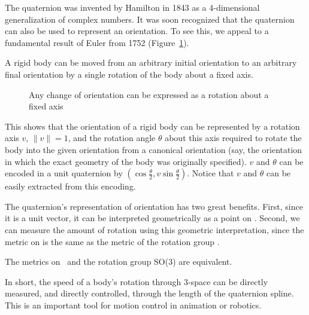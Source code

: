 The quaternion was invented by Hamilton in 1843
as a 4-dimensional generalization of complex numbers.
It was soon recognized that the quaternion can also be used
to represent an orientation.
To see this, we appeal to a fundamental result of Euler from 1752
\cite{goldstein50} (Figure~\ref{fig:eulerRotation}).	
\begin{theorem}[Euler]
A rigid body can be moved from an arbitrary initial orientation
to an arbitrary final orientation by a single rotation of the body
about a fixed axis.
\end{theorem}
%
\begin{figure}
\vspace{2.5in}
\caption{Any change of orientation can be expressed as a rotation about a fixed axis}
\label{fig:eulerRotation}
\end{figure}
%
This shows that the orientation of a rigid body can be represented by 
a rotation axis $v$, $\|v\|=1$, and the rotation angle $\theta$ about 
this axis required to rotate the body into the given orientation from a
canonical orientation (say, the orientation in which the exact geometry
of the body was originally specified).
$v$ and $\theta$ can be encoded in a unit quaternion by
$(\cos \frac{\theta}{2}, v \sin \frac{\theta}{2})$.
Notice that $v$ and $\theta$ can be easily extracted from this encoding.

The quaternion's representation of orientation has two great benefits.
First, since it is a unit vector, it can be interpreted geometrically
as a point on .
Second, we can measure the amount of rotation using this geometric
interpretation, since the metric on 
is the same as the metric of the rotation group \cite{misner73}.
%
\begin{theorem}
\label{thm:metric}
The metrics on \ and the rotation group SO(3) are equivalent.
\end{theorem}
%
In short, the speed of a body's rotation through 3-space
can be directly measured,
and directly controlled, through the length of the quaternion spline.
This is an important tool for motion control in animation or robotics.

